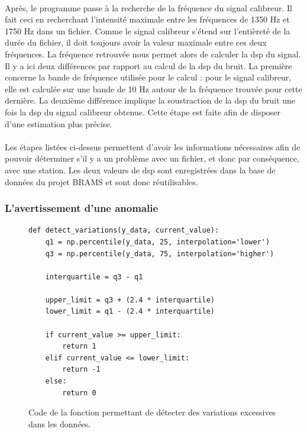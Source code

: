 \documentclass[11pt]{article}
\begin{document}
\\
Après, le programme passe à la recherche de la fréquence du signal calibreur.
Il fait ceci en recherchant l'intensité maximale entre les fréquences de 1350 Hz et 1750 Hz dans un fichier.
Comme le signal calibreur s'étend sur l'entièreté de la durée du fichier, il doit toujours avoir la valeur maximale entre ces deux fréquences.
La fréquence retrouvée nous permet alors de calculer la dsp du signal.
Il y a ici deux différences par rapport au calcul de la dsp du bruit.
La première concerne la bande de fréquence utilisée pour le calcul : pour le signal calibreur, elle est calculée sur une bande de 10 Hz autour de la fréquence trouvée pour cette dernière.
La deuxième différence implique la soustraction de la dsp du bruit une fois la dsp du signal calibreur obtenue.
Cette étape est faite afin de disposer d'une estimation plus précise.\\
\\
Les étapes listées ci-dessus permettent d'avoir les informations nécessaires afin de pouvoir déterminer s'il y a un problème avec un fichier, et donc par conséquence, avec une station.
Les deux valeurs de dsp sont enregistrées dans la base de données du projet BRAMS et sont donc réutilisables.

\subsubsection{L'avertissement d'une anomalie}

\begin{figure}
    \begin{lstlisting}[style=CStyle]
def detect_variations(y_data, current_value):
    q1 = np.percentile(y_data, 25, interpolation='lower')
    q3 = np.percentile(y_data, 75, interpolation='higher')

    interquartile = q3 - q1

    upper_limit = q3 + (2.4 * interquartile)
    lower_limit = q1 - (2.4 * interquartile)

    if current_value >= upper_limit:
        return 1
    elif current_value <= lower_limit:
        return -1
    else:
        return 0
    \end{lstlisting}
    \caption{Code de la fonction permettant de détecter des variations excessives dans les données.}
    \label{fig:detection-code}
\end{figure}
\end{document}
